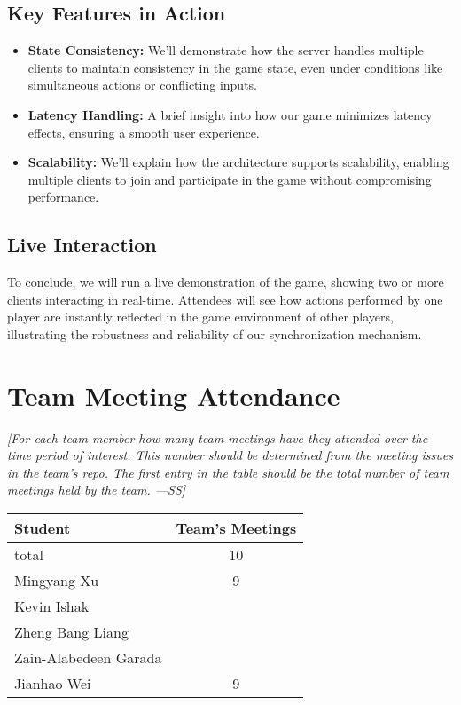 \documentclass[12pt]{article}
\begin{document}
\subsection{Key Features in Action}
\begin{itemize}
    \item \textbf{State Consistency:} We'll demonstrate how the server handles multiple clients to maintain consistency in the game state, even under conditions like simultaneous actions or conflicting inputs.
    \item \textbf{Latency Handling:} A brief insight into how our game minimizes latency effects, ensuring a smooth user experience.
    \item \textbf{Scalability:} We'll explain how the architecture supports scalability, enabling multiple clients to join and participate in the game without compromising performance.
\end{itemize}

\subsection{Live Interaction}
To conclude, we will run a live demonstration of the game, showing two or more clients interacting in real-time. Attendees will see how actions performed by one player are instantly reflected in the game environment of other players, illustrating the robustness and reliability of our synchronization mechanism.


\section{Team Meeting Attendance}
\textit{[For each team member how many team meetings have they attended over the time period of interest. This number should be determined from the meeting issues in the team’s repo. The first entry in the table should be the total number of team meetings held by the team. ---SS]}

\begin{longtable}{|l|c|}
\hline
\textbf{Student} & \textbf{Team's Meetings} \\
\hline
total & 10 \\
Mingyang Xu & 9 \\
Kevin Ishak &  \\
Zheng Bang Liang &  \\
Zain-Alabedeen Garada &  \\
Jianhao Wei & 9 \\
\hline
\end{longtable}
\end{document}
